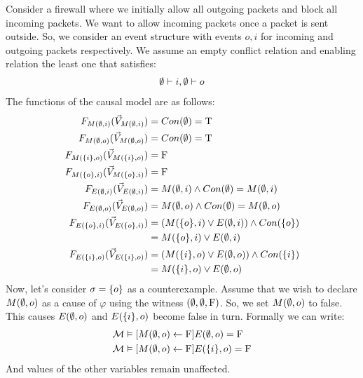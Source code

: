 \begin{example}
    Consider a firewall where we initially allow all outgoing packets and block all incoming packets.
    We want to allow incoming packets once a packet is sent outside.
    So, we consider an event structure with events $o,i$ for incoming and
    outgoing packets respectively.
    We assume an empty conflict relation and enabling relation
    the least one that satisfies:
    \begin{align*}
        \emptyset \vdash i, \emptyset \vdash o
    \end{align*}
    The functions of the causal model are as follows:
    \begin{align*}
        F_{M(\emptyset,i)}(\vec V_{M(\emptyset,i)})    & = Con(\emptyset) = \mathrm{T}                           \\
        F_{M(\emptyset,o)}(\vec V_{M(\emptyset,o)})    & = Con(\emptyset) = \mathrm{T}                           \\
        F_{M(\{i\},o)}(\vec V_{M(\{i\},o)}) & = \mathrm{F}                                     \\
        F_{M(\{o\},i)}(\vec V_{M(\{o\},i)}) & = \mathrm{F}                                     \\
        F_{E(\emptyset,i)}(\vec V_{E(\emptyset,i)})    & = M(\emptyset,i) \wedge Con(\emptyset) = M(\emptyset,i)       \\
        F_{E(\emptyset,o)}(\vec V_{E(\emptyset,o)})    & = M(\emptyset,o) \wedge Con(\emptyset) = M(\emptyset,o)       \\
        F_{E(\{o\},i)}(\vec V_{E(\{o\},i)}) & =
        \left( M(\{o\},i) \vee E(\emptyset,i)  \right) \wedge Con(\{o\}) \\
                       & = M(\{o\},i) \vee E(\emptyset,i)                \\
        F_{E(\{i\},o)}(\vec V_{E(\{i\},o)}) & =
        \left( M(\{i\},o) \vee E(\emptyset,o) \right)
        \wedge Con(\{i\})                                         \\
                       & = M(\{i\},o) \vee E(\emptyset,o)                \\
    \end{align*}
    Now, let's consider $\sigma = \{o\}$ as a counterexample.
    Assume that we wish to declare $M(\emptyset,o)$ as a cause of $\varphi$
    using the witness $(\emptyset,\emptyset,\mathrm{F})$.
    So, we set $M(\emptyset,o)$ to false.
    This causes $E(\emptyset,o)$ and $E(\{i\},o)$ become false in turn.
    Formally we can write:
    \begin{align*}
        \mathcal{M} & \vDash [M(\emptyset,o) \leftarrow \mathrm{F}] E(\emptyset,o) = \mathrm{F} \\
        \mathcal{M} & \vDash [M(\emptyset,o) \leftarrow \mathrm{F}] E(\{i\},o) = \mathrm{F} \\
    \end{align*}
    And values of the other variables remain unaffected.

\end{example}

